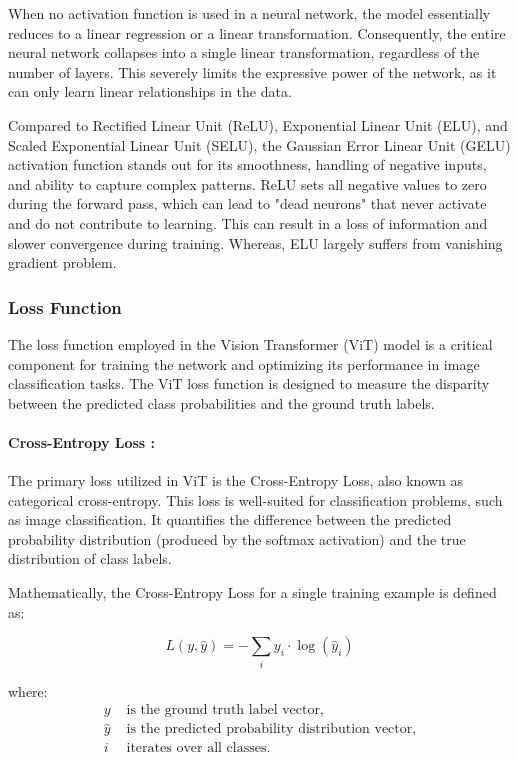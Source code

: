 When no activation function is used in a neural network, the model essentially reduces to a linear regression or a linear transformation. Consequently, the entire neural network collapses into a single linear transformation, regardless of the number of layers. This severely limits the expressive power of the network, as it can only learn linear relationships in the data.

Compared to Rectified Linear Unit (ReLU), Exponential Linear Unit (ELU), and Scaled Exponential Linear Unit (SELU), the Gaussian Error Linear Unit (GELU) activation function stands out for its smoothness, handling of negative inputs, and ability to capture complex patterns. ReLU sets all negative values to zero during the forward pass, which can lead to "dead neurons" that never activate and do not contribute to learning. This can result in a loss of information and slower convergence during training. Whereas, ELU largely suffers from vanishing gradient problem.

\subsubsection{Loss Function}
The loss function employed in the Vision Transformer (ViT) model is a critical component for training the network and optimizing its performance in image classification tasks. The ViT loss function is designed to measure the disparity between the predicted class probabilities and the ground truth labels.

\paragraph{Cross-Entropy Loss :}
The primary loss utilized in ViT is the Cross-Entropy Loss, also known as categorical cross-entropy. This loss is well-suited for classification problems, such as image classification. It quantifies the difference between the predicted probability distribution (produced by the softmax activation) and the true distribution of class labels.

Mathematically, the Cross-Entropy Loss for a single training example is defined as:

\begin{equation}
    L(y, \hat{y}) = -\sum_i y_i \cdot \log(\hat{y}_i) \label{eq:loss_function}
\end{equation}

where:
\begin{align*}
    y       & \text{ is the ground truth label vector,}                 \\
    \hat{y} & \text{ is the predicted probability distribution vector,} \\
    i       & \text{ iterates over all classes.}
\end{align*}

